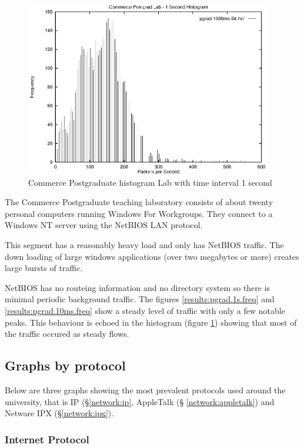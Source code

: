\begin{figure}
\includegraphics[height=3in]{pics/pgrad-1s-hist-04.eps}
\caption{Commerce Postgraduate histogram Lab with time interval 1 second}
\label{results:pgrad.1s.hist}
\end{figure}

The Commerce Postgraduate teaching laboratory consists of about twenty
personal computers running Windows For Workgroups.  They connect to a
Windows NT server using the NetBIOS LAN protocol.

This segment has a reasonably heavy load and only has NetBIOS traffic.
The down loading of large windows applications (over two megabytes or
more) creates large bursts of traffic.

NetBIOS has no routeing information and no directory system so there
is minimal periodic background traffic.  The figures
\ref{results:pgrad.1s.freq} and \ref{results:pgrad.10ms.freq} show a
steady level of traffic with only a few notable peaks.  This behaviour
is echoed in the histogram (figure \ref{results:pgrad.1s.hist})
showing that most of the traffic occured as steady flows.

\subsection{Graphs by protocol}

Below are three graphs showing the most prevalent protocols used
around the university, that is IP (\S \ref{network:ip}, AppleTalk (\S 
\ref{network:appletalk}) and Netware IPX (\S \ref{network:ipx}).

\subsubsection{Internet Protocol}

